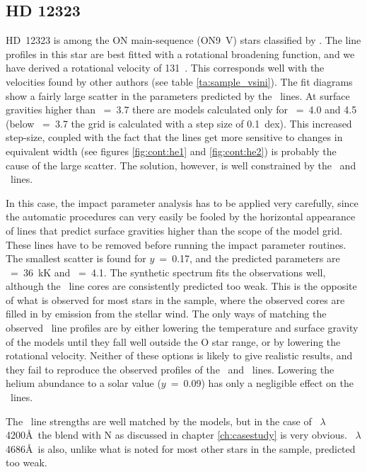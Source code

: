 \subsection{HD 12323}  %
\label{analysis:hd012323}
HD~12323 is among the ON main-sequence (ON9~V) stars classified by
. The line profiles in this star are best fitted with a
rotational broadening function, and we have derived a rotational
velocity of 131~\kms. This corresponds well with the velocities found
by other authors (see table \ref{ta:sample_vsini}). The fit diagrams
show a fairly large scatter in the parameters predicted by the \hei\
lines. At surface gravities higher than \logg~=~3.7 there are models
calculated only for \logg~=~4.0 and 4.5 (below \logg~=~3.7 the grid is
calculated with a step size of 0.1~dex). This increased step-size,
coupled with the fact that the lines get more sensitive to changes in
equivalent width (see figures \ref{fig:cont:he1} and
\ref{fig:cont:he2}) is probably the cause of the large scatter. The
solution, however, is well constrained by the \hi\ and
\heii\ lines.

In this case, the impact parameter analysis has to be applied very
carefully, since the automatic procedures can very easily be fooled by
the horizontal appearance of lines that predict surface gravities
higher than the scope of the model grid. These lines have to be
removed before running the impact parameter routines. The smallest
scatter is found for $y$~=~0.17, and the predicted parameters are
\teff~=~36~kK and
\logg~=~4.1. The synthetic spectrum fits the observations well,
although the \hi\ line cores are consistently predicted too weak. This
is the opposite of what is observed for most stars in the sample,
where the observed cores are filled in by emission from the stellar wind. The
only ways of matching the observed \hi\ line profiles are by either
lowering the temperature and surface gravity of the models until they
fall well outside the O star range, or by lowering the rotational
velocity. Neither of these options is likely to give realistic
results, and they fail to reproduce the observed profiles of the \hei\
and \heii\ lines. Lowering the helium abundance to a solar value
($y$~=~0.09) has only a negligible effect on the \hi\ lines.

The \heii\ line strengths are well matched by the models, but in the
case of \heii~$\lambda$4200\AA\ the blend with N as discussed
in chapter \ref{ch:casestudy} is very obvious. \heii~$\lambda$4686\AA\
is also, unlike what is noted for most other stars in the sample,
predicted too weak.

